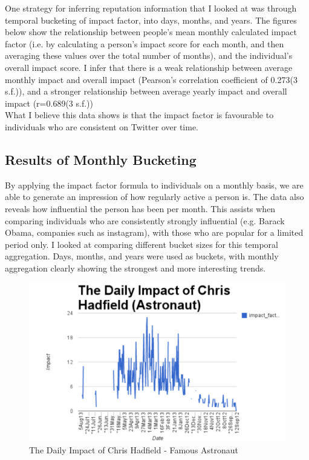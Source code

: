 One strategy for inferring reputation information that I looked at was through temporal bucketing of impact factor, into days, months, and years. The figures below show the relationship between people's mean monthly calculated impact factor (i.e. by calculating a person's impact score for each month, and then averaging these values over the total number of months), and the individual's overall impact score. I infer that there is a weak relationship between average monthly impact and overall impact (Pearson's correlation coefficient of 0.273(3 s.f.)), and a stronger relationship between average yearly impact and overall impact (r=0.689(3 s.f.))\\

\noindent What I believe this data shows is that the impact factor is favourable to individuals who are consistent on Twitter over time. 

\subsection{Results of Monthly Bucketing}

By applying the impact factor formula to individuals on a monthly basis, we are able to generate an impression of how regularly active a person is. The data also reveals how influential the person has been per month. This assists when comparing individuals who are consistently strongly influential (e.g. Barack Obama, companies such as instagram), with those who are popular for a limited period only. I looked at comparing different bucket sizes for this temporal aggregation. Days, months, and years were used as buckets, with monthly aggregation clearly showing the strongest and more interesting trends. 

\begin{figure}[h!]
\centering
\includegraphics{Images/daily_impact_chris_hadfield.pdf}
\caption{The Daily Impact of Chris Hadfield - Famous Astronaut}
\end{figure}

